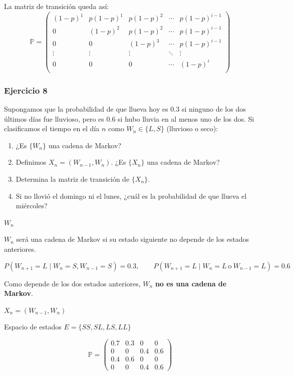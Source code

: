 La matriz de transición queda así:
\[
\mathbb{P}=
\begin{pmatrix}
(1-p)^1 & p(1-p)^1 & p(1-p)^2 & \cdots & p(1-p)^{i-1} \\[1mm]
0 & (1-p)^2 & p(1-p)^2 & \cdots & p(1-p)^{i-1}\\[1mm]
0 & 0 & (1-p)^3 & \cdots & p(1-p)^{i-1}  \\[1mm]
\vdots & \vdots & \vdots & \ddots & \vdots \\[1mm]
0 & 0 & 0 & \cdots & (1-p)^i\\[1mm]

\end{pmatrix}
\]



\subsubsection{Ejercicio 8}

\begin{exercise}
Supongamos que la probabilidad de que llueva hoy es $0.3$ si ninguno de los dos últimos días fue lluvioso, pero es $0.6$ si hubo lluvia en al menos uno de los dos. Si clasificamos el tiempo en el día $n$ como $W_n \in \{L,S\}$ (lluvioso o seco):

\begin{enumerate}
    \item ¿Es $\{W_n\}$ una cadena de Markov?
    \item Definimos $X_n = (W_{n-1}, W_n)$. ¿Es $\{X_n\}$ una cadena de Markov?
    \item Determina la matriz de transición de $\{X_n\}$.
    \item Si no llovió el domingo ni el lunes, ¿cuál es la probabilidad de que llueva el miércoles?
\end{enumerate}
\end{exercise}

\textbf{$W_n$}

$W_n$ será una cadena de Markov si su estado siguiente no depende de los estados anteriores.

\[
P(W_{n+1}=L \mid W_{n}=S, W_{n-1}=S)=0.3,\qquad
P(W_{n+1}=L \mid W_{n}=L\ \text{o}\ W_{n-1}=L)=0.6
\]

Como depende de los dos estados anteriores, $W_n$ \textbf{no es una cadena de Markov}.

\medskip
\textbf{$X_n=(W_{n-1},W_n)$}

Espacio de estados $E=\{SS,SL,LS,LL\}$

\[
\mathbb{P}=
\begin{pmatrix}
0.7 & 0.3 & 0   & 0   \\
0   & 0   & 0.4 & 0.6 \\
0.4 & 0.6 & 0   & 0   \\
0   & 0   & 0.4 & 0.6
\end{pmatrix}
\]

